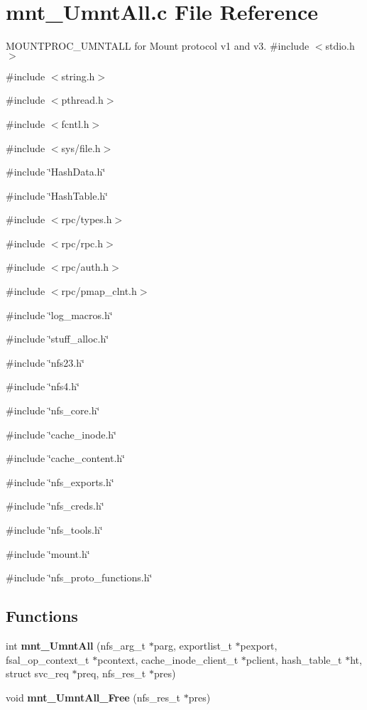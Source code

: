 \section{mnt\_\-UmntAll.c File Reference}
\label{mnt__UmntAll_8c}


MOUNTPROC\_\-UMNTALL for Mount protocol v1 and v3.  
{\ttfamily \#include $<$stdio.h$>$}\par
{\ttfamily \#include $<$string.h$>$}\par
{\ttfamily \#include $<$pthread.h$>$}\par
{\ttfamily \#include $<$fcntl.h$>$}\par
{\ttfamily \#include $<$sys/file.h$>$}\par
{\ttfamily \#include \char`\"{}HashData.h\char`\"{}}\par
{\ttfamily \#include \char`\"{}HashTable.h\char`\"{}}\par
{\ttfamily \#include $<$rpc/types.h$>$}\par
{\ttfamily \#include $<$rpc/rpc.h$>$}\par
{\ttfamily \#include $<$rpc/auth.h$>$}\par
{\ttfamily \#include $<$rpc/pmap\_\-clnt.h$>$}\par
{\ttfamily \#include \char`\"{}log\_\-macros.h\char`\"{}}\par
{\ttfamily \#include \char`\"{}stuff\_\-alloc.h\char`\"{}}\par
{\ttfamily \#include \char`\"{}nfs23.h\char`\"{}}\par
{\ttfamily \#include \char`\"{}nfs4.h\char`\"{}}\par
{\ttfamily \#include \char`\"{}nfs\_\-core.h\char`\"{}}\par
{\ttfamily \#include \char`\"{}cache\_\-inode.h\char`\"{}}\par
{\ttfamily \#include \char`\"{}cache\_\-content.h\char`\"{}}\par
{\ttfamily \#include \char`\"{}nfs\_\-exports.h\char`\"{}}\par
{\ttfamily \#include \char`\"{}nfs\_\-creds.h\char`\"{}}\par
{\ttfamily \#include \char`\"{}nfs\_\-tools.h\char`\"{}}\par
{\ttfamily \#include \char`\"{}mount.h\char`\"{}}\par
{\ttfamily \#include \char`\"{}nfs\_\-proto\_\-functions.h\char`\"{}}\par
\subsection*{Functions}
\begin{DoxyCompactItemize}
\item 
int {\bf mnt\_\-UmntAll} (nfs\_\-arg\_\-t $\ast$parg, exportlist\_\-t $\ast$pexport, fsal\_\-op\_\-context\_\-t $\ast$pcontext, cache\_\-inode\_\-client\_\-t $\ast$pclient, hash\_\-table\_\-t $\ast$ht, struct svc\_\-req $\ast$preq, nfs\_\-res\_\-t $\ast$pres)
\item 
void {\bf mnt\_\-UmntAll\_\-Free} (nfs\_\-res\_\-t $\ast$pres)
\end{DoxyCompactItemize}


